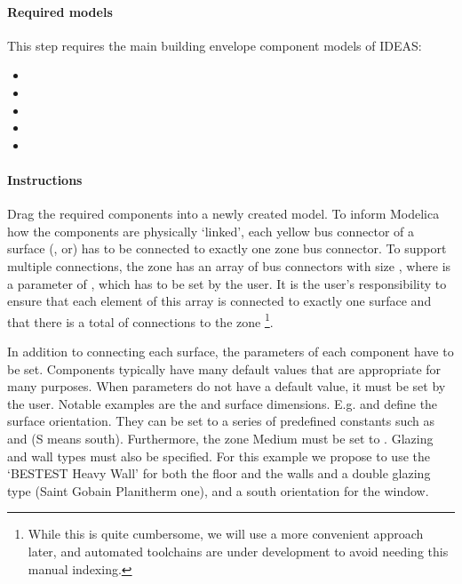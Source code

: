 \documentclass[10pt,a4paper]{article}
\begin{document}
\paragraph{Required models}
This step requires the main building envelope component models of IDEAS:
\begin{itemize}
\item {}
\item {}
\item {}
\item {}
\item {}
\end{itemize}

\paragraph{Instructions}
Drag the required components into a newly created model. To inform Modelica how the components are physically `linked', each yellow bus connector of a surface (,  or) has to be connected to exactly one zone bus connector.
To support multiple connections, the zone has an array of bus connectors with size , where  is a parameter of , which has to be set by the user. It is the user's responsibility to ensure that each element of this array is connected to exactly one surface and that there is a total of  connections to the zone \footnote{While this is quite cumbersome, we will use a more convenient approach later, and automated toolchains are under development to avoid needing this manual indexing.}.

In addition to connecting each surface, the parameters of each component have to be set. 
Components typically have many default values that are appropriate for many purposes.
When parameters do not have a default value, it must be set by the user. 
Notable examples are the  and surface dimensions. 
E.g.  and  define the surface orientation.
They can be set to a series of predefined constants such as 
and  (S means south).
Furthermore, the zone Medium must be set to .
Glazing and wall types must also be specified.
For this example we propose to use the `BESTEST Heavy Wall' for both the floor and the walls
and a double glazing type (Saint Gobain Planitherm one), and a south orientation for the window.
\end{document}
